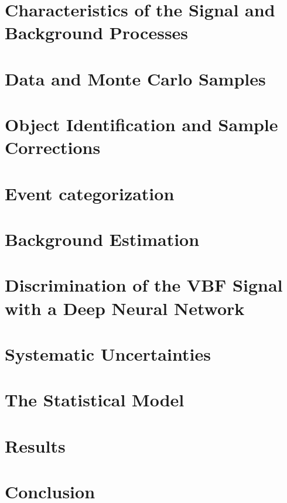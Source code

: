 
\section{Characteristics of the Signal and Background Processes}
\label{sec:signal-bkg-characteristics}



\section{Data and Monte Carlo Samples}
\label{sec:data-mc-samples}



\section{Object Identification and Sample Corrections}
\label{sec:object-selection}



\section{Event categorization}
\label{sec:event-categorization}



\section{Background Estimation}
\label{sec:bkg-estimation}


\section{Discrimination of the VBF Signal with a Deep Neural Network}
\label{sec:dnn}



\section{Systematic Uncertainties}
\label{sec:systematics}



\section{The Statistical Model}
\label{sec:stats-analysis}



\section{Results}
\label{sec:hww-results}


\section{Conclusion}
\label{sec:conclusion}
